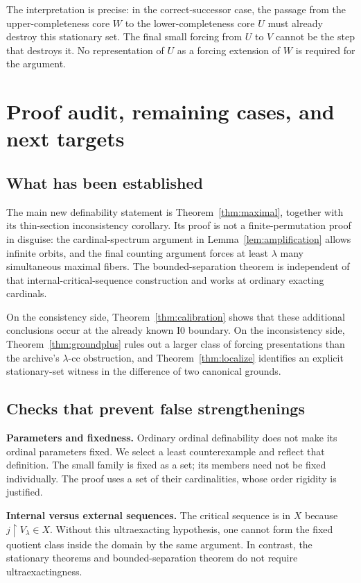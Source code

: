 \documentclass[11pt,letterpaper]{article}
\theoremstyle{definition}
\numberwithin{equation}{section}
\newcommand{\restr}{\mathbin{\upharpoonright}}
\newcommand{\Izero}{\mathrm{I0}}
\newcommand{\cc}{\text{-cc}}
\begin{document}
The interpretation is precise: in the correct-successor case, the passage from the upper-completeness core $W$ to the lower-completeness core $U$ must already destroy this stationary set. The final small forcing from $U$ to $V$ cannot be the step that destroys it. No representation of $U$ as a forcing extension of $W$ is required for the argument.

\section{Proof audit, remaining cases, and next targets}\label{sec:limits}

\subsection{What has been established}

The main new definability statement is Theorem~\ref{thm:maximal}, together with its thin-section inconsistency corollary. Its proof is not a finite-permutation proof in disguise: the cardinal-spectrum argument in Lemma~\ref{lem:amplification} allows infinite orbits, and the final counting argument forces at least $\lambda$ many simultaneous maximal fibers. The bounded-separation theorem is independent of that internal-critical-sequence construction and works at ordinary exacting cardinals.

On the consistency side, Theorem~\ref{thm:calibration} shows that these additional conclusions occur at the already known $\Izero$ boundary. On the inconsistency side, Theorem~\ref{thm:groundplus} rules out a larger class of forcing presentations than the archive's $\lambda\cc$ obstruction, and Theorem~\ref{thm:localize} identifies an explicit stationary-set witness in the difference of two canonical grounds.

\subsection{Checks that prevent false strengthenings}

\textbf{Parameters and fixedness.} Ordinary ordinal definability does not make its ordinal parameters fixed. We select a least counterexample and reflect that definition. The small family is fixed as a set; its members need not be fixed individually. The proof uses a set of their cardinalities, whose order rigidity is justified.

\textbf{Internal versus external sequences.} The critical sequence is in $X$ because $j\restr V_\lambda\in X$. Without this ultraexacting hypothesis, one cannot form the fixed quotient class inside the domain by the same argument. In contrast, the stationary theorems and bounded-separation theorem do not require ultraexactingness.
\end{document}
